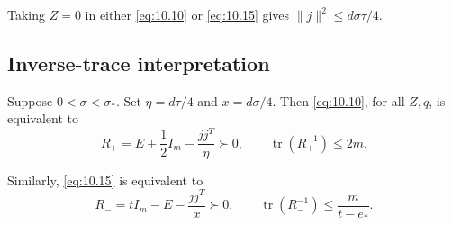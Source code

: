 Taking $Z=0$ in either \eqref{eq:10.10} or \eqref{eq:10.15} gives $\|j\|^2\le d\sigma\tau/4$.

\subsection{Inverse-trace interpretation}\label{sec:10.5}

\begin{lemma}\label{lem-inverse-trace}
Suppose $0<\sigma<\sigma_*$. Set $\eta=d\tau/4$ and $x=d\sigma/4$. Then \eqref{eq:10.10}, for all $Z,q$, is equivalent to
\begin{equation}\label{eq:10.19}
R_+=E+\frac12I_m-\frac{jj^T}{\eta}\succ0,
\qquad \operatorname{tr}(R_+^{-1})\le2m.
\end{equation}

Similarly, \eqref{eq:10.15} is equivalent to
\begin{equation}\label{eq:10.20}
R_-=tI_m-E-\frac{jj^T}{x}\succ0,
\qquad \operatorname{tr}(R_-^{-1})\le\frac{m}{t-e_*}.
\end{equation}

\end{lemma}

